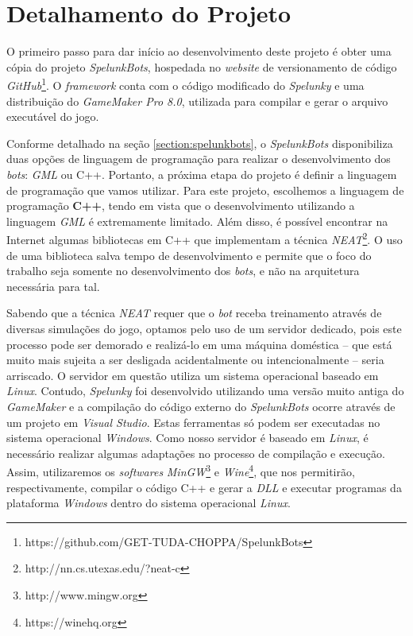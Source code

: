 \section{\label{section:project-details}Detalhamento do Projeto}
O primeiro passo para dar início ao desenvolvimento deste projeto é obter uma
cópia do projeto \textit{SpelunkBots}, hospedada no \textit{website} de
versionamento de código
\textit{GitHub}\footnote{https://github.com/GET-TUDA-CHOPPA/SpelunkBots}. O
\textit{framework} conta com o código modificado do \textit{Spelunky} e uma
distribuição do \textit{GameMaker Pro 8.0}, utilizada para compilar e gerar o
arquivo executável do jogo.

Conforme detalhado na seção \ref{section:spelunkbots}, o \textit{SpelunkBots}
disponibiliza duas opções de linguagem de programação para realizar o
desenvolvimento dos \textit{bots}: \textit{GML} ou C++. Portanto, a próxima
etapa do projeto é definir a linguagem de programação que vamos utilizar. Para
este projeto, escolhemos a linguagem de programação \textbf{C++}, tendo em vista
que o desenvolvimento utilizando a linguagem \textit{GML} é extremamente
limitado. Além disso, é possível encontrar na Internet algumas bibliotecas em
C++ que implementam a técnica
\textit{NEAT}\footnote{http://nn.cs.utexas.edu/?neat-c}. O uso de uma biblioteca
salva tempo de desenvolvimento e permite que o foco do trabalho seja somente no
desenvolvimento dos \textit{bots}, e não na arquitetura necessária para tal.

Sabendo que a técnica \textit{NEAT} requer que o \textit{bot} receba treinamento
através de diversas simulações do jogo, optamos pelo uso de um servidor
dedicado, pois este processo pode ser demorado e realizá-lo em uma máquina
doméstica -- que está muito mais sujeita a ser desligada acidentalmente ou
intencionalmente -- seria arriscado. O servidor em questão utiliza um sistema
operacional baseado em \textit{Linux}.  Contudo, \textit{Spelunky} foi
desenvolvido utilizando uma versão muito antiga do \textit{GameMaker} e a
compilação do código externo do \textit{SpelunkBots} ocorre através de um
projeto em \textit{Visual Studio}.  Estas ferramentas só podem ser executadas no
sistema operacional \textit{Windows}. Como nosso servidor é baseado em
\textit{Linux}, é necessário realizar algumas adaptações no processo de
compilação e execução. Assim, utilizaremos os \textit{softwares}
\textit{MinGW}\footnote{http://www.mingw.org} e
\textit{Wine}\footnote{https://winehq.org}, que nos permitirão, respectivamente,
compilar o código C++ e gerar a \textit{DLL} e executar programas da plataforma
\textit{Windows} dentro do sistema operacional \textit{Linux}.

